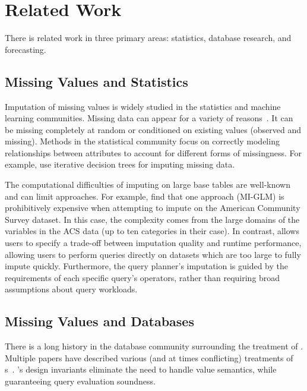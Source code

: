 \section{Related Work}\label{sec:relatedwork}

There is related work in three primary areas: statistics, database research, and forecasting.

\subsection{Missing Values and Statistics}

Imputation of missing values is widely studied in the statistics and machine
learning communities. Missing data
can appear for a variety of reasons~\cite{gelman2006data}.
It can be missing completely at random or conditioned on
existing values (observed and missing). Methods in the statistical community
focus on correctly modeling relationships between attributes to account for different forms
of missingness.
For example, \textcite*{burgette2010multiple} use iterative decision trees for imputing missing data.

The computational difficulties of imputing on large base
tables are well-known and can limit approaches. %
For example, \textcite*{akande2015empirical} find that one approach (MI-GLM) is prohibitively expensive when attempting to impute on the American Community Survey dataset.
In this case, the complexity comes from the large domains of the variables in the ACS data (up to ten categories in their case).
In contrast, \ProjectName{} allows users to specify a trade-off between
imputation quality and runtime performance, allowing users to perform queries
directly on datasets which are too large to fully impute quickly. Furthermore,
the query planner's imputation is guided by the requirements of each specific
query's operators, rather than requiring broad assumptions about query
workloads.  

\subsection{Missing Values and Databases}\label{subsec:missing-value}
There is a long history in the database community surrounding the
treatment of \nullv{}.
Multiple papers have described various (and at times conflicting) treatments of \nullv{}s~\cite{codd1973understanding,grant1977null}.
\ProjectName's design invariants eliminate
the need to handle \nullv{} value semantics, while guaranteeing query evaluation soundness.

